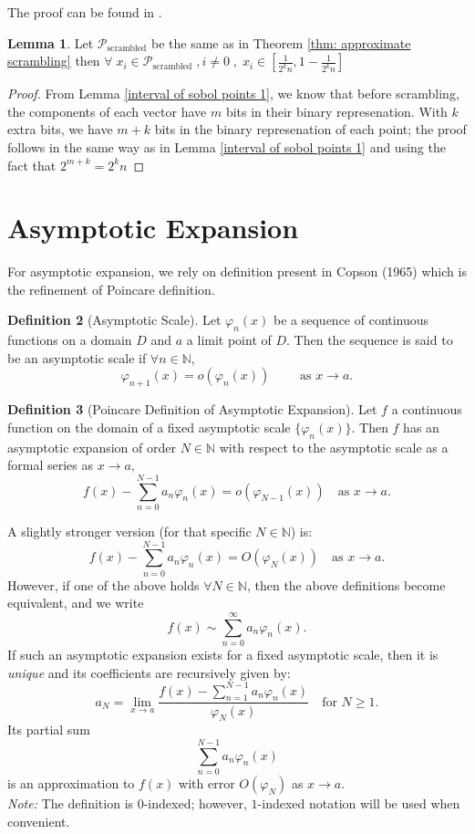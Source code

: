 \documentclass{article}
\theoremstyle{definition}
\newtheorem{appendixdefinition}{Definition}[section]
\newtheorem{appendixlemma}[appendixdefinition]{Lemma}
\begin{document}
\begin{appendices}
\noindent The proof can be found in \cite{DickJosef2010D}.
\begin{appendixlemma}
\label{lem:r1}
Let $\mathcal{P}_{\text{scrambled}}$ be the same as in Theorem \ref{thm: approximate scrambling} then 
\(\forall \;x_i\in\mathcal{P}_{\text{scrambled}}\;, i\neq 0 \;,\; x_{i}\in\left[\frac{1}{2^{k}n},1-\frac{1}{2^{k}n}\right]
\)
\end{appendixlemma}
\begin{proof}
From Lemma \ref{interval of sobol points 1}, we know that before scrambling, the components of each vector have $m$ bits in their binary represenation. With $k$ extra bits, we have $m+k$ bits in the binary represenation of each point; the proof follows in the same way as in Lemma \ref{interval of sobol points 1} and using the fact that $2^{m+k}=2^{k}n$
\end{proof}


\section{Asymptotic Expansion}
For asymptotic expansion, we rely on definition present in Copson (1965) \cite{Copson_1965} which is the refinement of Poincare definition.
\begin{appendixdefinition}[Asymptotic Scale]\label{def:asymptotic-scale}
Let \( \varphi_n(x) \) be a sequence of continuous functions on a domain \(D \) and \( a \) a limit point of \( D \). Then the sequence is said to be an asymptotic scale if \( \forall n \in \mathbb{N} \),
\[
\varphi_{n+1}(x) = o(\varphi_n(x)) \qquad \text{ as }  x \to a.
\]
\end{appendixdefinition}

\begin{appendixdefinition}[Poincare Definition of Asymptotic Expansion]\label{def:asymptotic-expansion}
Let \( f \) a continuous function on the domain of a fixed asymptotic scale \( \{ \varphi_n(x)\} \).
Then \( f \) has an asymptotic expansion of order \(N\in\mathbb{N}\) with respect to the asymptotic scale as a formal series as \(x \to a \),
\[
f(x)-\sum_{n=0}^{N-1} a_n\varphi_n(x) = o( \varphi_{N-1}(x)) \quad \text{as } x \to a.
\]

A slightly stronger version (for that specific \(N\in\mathbb{N}\)) is:
\[
f(x)-\sum_{n=0}^{N-1}a_n\varphi_n(x)=O(\varphi_{N}(x)) \quad\text{as }x\to a.
\]
However, if one of the above holds \(\forall N\in\mathbb{N}\), then the above definitions become equivalent, and we write
\[ 
f(x) \sim \sum_{n=0}^\infty a_n \varphi_n(x).
\]
If such an asymptotic expansion exists for a fixed asymptotic scale, then it is \emph{unique} and its coefficients are recursively given by:
\[
a_{N} = \lim_{x \to a} \frac{f(x)- \sum_{n=1}^{N-1} a_n \varphi_n(x) }{\varphi_{N}(x)} \quad \text{for }N\ge1.
\]
Its partial sum
\[
\sum_{n=0}^{N-1} a_n \varphi_n(x)
\]
is an approximation to \( f(x) \) with error \( O(\varphi_N)\) as \( x \to a\).\\
\textit{Note:} The definition is \(0\)-indexed; however, \(1\)-indexed notation will be used when convenient.
\end{appendixdefinition}


\end{appendices}
\end{document}
